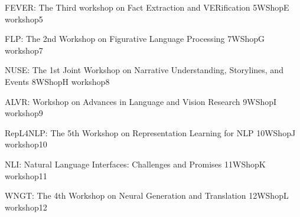 \begin{wsschedule}
    {FEVER: The Third workshop on Fact Extraction and VERification}
    {5}{WShopE}
    {workshop5}
    {\WShopLocE}
    
\end{wsschedule}

%     

\begin{wsschedule}
    {FLP: The 2nd Workshop on Figurative Language Processing}
    {7}{WShopG}
    {workshop7}
    {\WShopLocG}
    
\end{wsschedule}

\begin{wsschedule}
    {NUSE: The 1st Joint Workshop on Narrative Understanding, Storylines, and Events}
    {8}{WShopH}
    {workshop8}
    {\WShopLocH}
    
\end{wsschedule}

\begin{wsschedule}
    {ALVR: Workshop on Advances in Language and Vision Research}
    {9}{WShopI}
    {workshop9}
    {\WShopLocI}
    
\end{wsschedule}

\begin{wsschedule}
    {RepL4NLP: The 5th Workshop on Representation Learning for NLP}
    {10}{WShopJ}
    {workshop10}
    {\WShopLocJ}
    
\end{wsschedule}



\begin{wsschedule}
    {NLI: Natural Language Interfaces: Challenges and Promises}
    {11}{WShopK}
    {workshop11}
    {\WShopLocK}
    
\end{wsschedule}

\begin{wsschedule}
    {WNGT: The 4th Workshop on Neural Generation and Translation}
    {12}{WShopL}
    {workshop12}
    {\WShopLocL}
    
\end{wsschedule}

